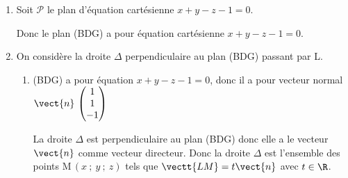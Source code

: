 \begin{enumerate}
\begin{enumerate}
{$\vectt{IL} = \dfrac{3}{4} \vectt{IG}	
\iff
\left \{
\begin{array}{l !{=} l}
x_{\text L} - \frac{1}{2} & \frac{3}{4} \times \frac{1}{2} \\ 
y_{\text L} - \frac{1}{2} & \frac{3}{4} \times \frac{1}{2}\\ 
z_{\text L} &\frac{3}{4} \times 1
\end{array}
\right .
\iff
\left \{
\begin{array}{l !{=}l}
x_{\text L} & \frac{3}{8} + \frac{1}{2} \\ 
y_{\text L} &\frac{3}{8} + \frac{1}{2}\\ 
z_{\text L} &\frac{3}{4}
\end{array}
\right .
\iff
\left \{
\begin{array}{l !{=}l}
x_{\text L} & \frac{7}{8} \\ 
y_{\text L} &\frac{7}{8}\\ 
z_{\text L} &\frac{3}{4}
\end{array}
\right .$
}%
	\end{enumerate}
	
\item Soit $\mathcal{P}$ le plan d'équation cartésienne $x + y - z - 1 = 0$.


Donc le plan (BDG) a pour équation cartésienne $x + y - z - 1 = 0$.

\item On considère la droite $\Delta$ perpendiculaire au plan (BDG) passant par L.
	\begin{enumerate}
		\item 
(BDG) a pour équation $x+y-z-1=0$, donc il a pour vecteur normal
$\vect{n}\,\begin{pmatrix} 1 \\ 1 \\ -1\end{pmatrix}$

La droite $\Delta$ est perpendiculaire au plan (BDG) donc elle a le vecteur $\vect{n}$ comme vecteur directeur.
Donc la droite $\Delta$ est l'ensemble des points M\,$(x~;~y~;~z)$ tels que $\vectt{LM}=t\vect{n}$ avec $t\in\R$.


\end{enumerate}
\end{enumerate}
